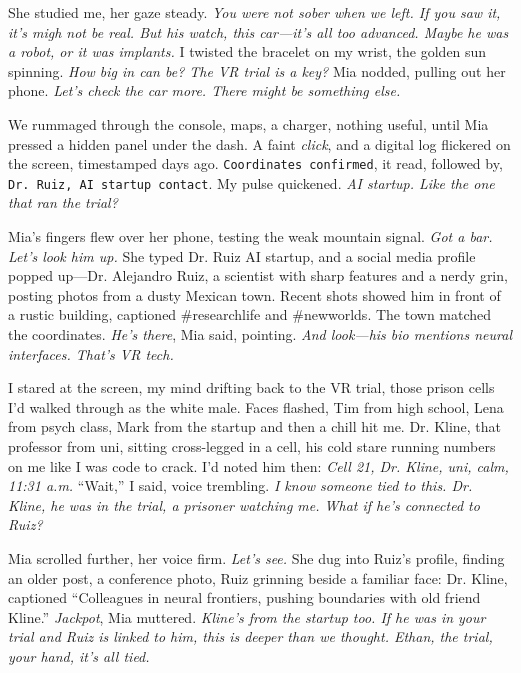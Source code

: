 \documentclass[12pt,oneside]{book} %
\newcommand{\note}[1]{\texttt{#1}}
\begin{document}
She studied me, her gaze steady. \textit{You were not sober when we left. If you saw it, it’s migh not be real. But his watch, this car—it’s all too advanced. Maybe he was a robot, or it was implants.} I twisted the bracelet on my wrist, the golden sun spinning. \textit{How big in can be? The VR trial is a key?} Mia nodded, pulling out her phone. \textit{Let’s check the car more. There might be something else.}

We rummaged through the console, maps, a charger, nothing useful, until Mia pressed a hidden panel under the dash. A faint \textit{click}, and a digital log flickered on the screen, timestamped days ago. \note{Coordinates confirmed}, it read, followed by, \note{Dr. Ruiz, AI startup contact}. My pulse quickened. \textit{AI startup. Like the one that ran the trial?}

Mia’s fingers flew over her phone, testing the weak mountain signal. \textit{Got a bar. Let’s look him up.} She typed \textnormal{Dr. Ruiz AI startup}, and a social media profile popped up—Dr. Alejandro Ruiz, a scientist with sharp features and a nerdy grin, posting photos from a dusty Mexican town. Recent shots showed him in front of a rustic building, captioned \textnormal{\#researchlife} and \textnormal{\#newworlds}. The town matched the coordinates. \textit{He’s there}, Mia said, pointing. \textit{And look—his bio mentions neural interfaces. That’s VR tech.}

I stared at the screen, my mind drifting back to the VR trial, those prison cells I’d walked through as the white male. Faces flashed, Tim from high school, Lena from psych class, Mark from the startup and then a chill hit me. Dr. Kline, that professor from uni, sitting cross-legged in a cell, his cold stare running numbers on me like I was code to crack. I’d noted him then: \textit{Cell 21, Dr. Kline, uni, calm, 11:31 a.m.} “Wait,” I said, voice trembling. \textit{I know someone tied to this. Dr. Kline, he was in the trial, a prisoner watching me. What if he’s connected to Ruiz?}

Mia scrolled further, her voice firm. \textit{Let’s see.} She dug into Ruiz’s profile, finding an older post, a conference photo, Ruiz grinning beside a familiar face: Dr. Kline, captioned \textnormal{“Colleagues in neural frontiers, pushing boundaries with old friend Kline.”} \textit{Jackpot}, Mia muttered. \textit{Kline’s from the startup too. If he was in your trial and Ruiz is linked to him, this is deeper than we thought. Ethan, the trial, your hand, it’s all tied.}
\end{document}
